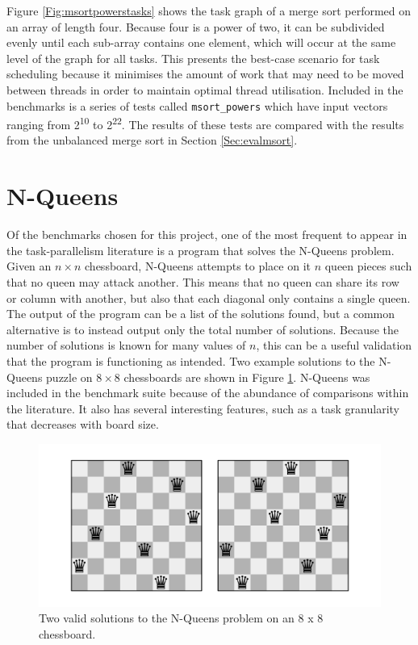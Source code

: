 \documentclass{report}
\begin{document}
Figure \ref{Fig:msortpowerstasks} shows the task graph of a merge sort performed on an array of length four. Because four is a power of two, it can be subdivided evenly until each sub-array contains one element, which will occur at the same level of the graph for all tasks. This presents the best-case scenario for task scheduling because it minimises the amount of work that may need to be moved between threads in order to maintain optimal thread utilisation. Included in the benchmarks is a series of tests called \verb!msort_powers! which have input vectors ranging from 2\textsuperscript{10} to 2\textsuperscript{22}. The results of these tests are compared with the results from the 
unbalanced merge sort in Section \ref{Sec:evalmsort}.

\section{N-Queens} \label{Sec:nqueens}

Of the benchmarks chosen for this project, one of the most frequent to appear in the task-parallelism literature is a program that solves the N-Queens problem. Given an \(n \times n\) chessboard, N-Queens attempts to place on it \(n\) queen pieces such that no queen may attack another. This means that no queen can share its row or column with another, but also that each diagonal only contains a single queen. The output of the program can be a list of the solutions found, but a common alternative is to instead output only the total number of solutions. Because the number of solutions is known for many values of \(n\), this can be a useful validation that the program is functioning as intended. Two example solutions to the N-Queens puzzle on \(8 \times 8\) chessboards are shown in Figure \ref{Fig:nqueenssolutions}. N-Queens was included in the benchmark suite because of the abundance of comparisons within the literature. It also has several interesting features, such as a task granularity that decreases with board size.
\noindent
\begin{figure}
	\includegraphics[width=\linewidth]{../diagrams/nqueens_solutions}
	\caption{Two valid solutions to the N-Queens problem on an 8 x 8 chessboard.}
	\label{Fig:nqueenssolutions}
\end{figure}
\end{document}

